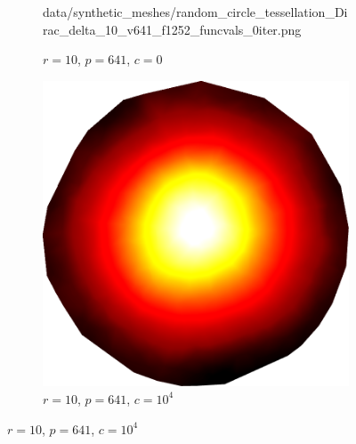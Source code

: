 \begin{figure}[ht]
\begin{subfigure}[b]{0.32\linewidth}
		{data/synthetic_meshes/random_circle_tessellation_Dirac_delta_10_v641_f1252_funcvals_0iter.png}
		\caption{$r=10$, $p=641$, $c=0$}\label{fig:rcirc.d}
	\end{subfigure}
	\begin{subfigure}[b]{0.32\linewidth}
		\includegraphics[width=\linewidth]
		{data/synthetic_meshes/random_circle_tessellation_Dirac_delta_10_v641_f1252_funcvals_10000iter.png}
		\caption{$r=10$, $p=641$, $c=10^4$}\label{fig:rcirc.f}
	\end{subfigure}
\end{figure}

